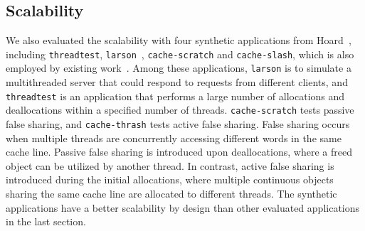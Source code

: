 \subsection{Scalability}
\label{sec:scale}

We also evaluated the scalability with four synthetic applications from Hoard~\cite{Hoard}, including \texttt{threadtest}, \texttt{larson}~\cite{Larson}, \texttt{cache-scratch} and \texttt{cache-slash}, which is also employed by existing work~\cite{Scalloc}. Among these applications, \texttt{larson} is to simulate a multithreaded server that could respond to requests from different clients, and \texttt{threadtest} is an application that performs a large number of allocations and deallocations within a specified number of threads. \texttt{cache-scratch} tests passive false sharing, and \texttt{cache-thrash} tests active false sharing. False sharing occurs when multiple threads are concurrently accessing different words in the same cache line. Passive false sharing is introduced upon deallocations, where a freed object can be utilized by another thread. In contrast, active false sharing is introduced during the initial allocations, where multiple continuous objects sharing the same cache line are allocated to different threads. The synthetic applications have a better scalability by design than other evaluated applications in the last section. 

